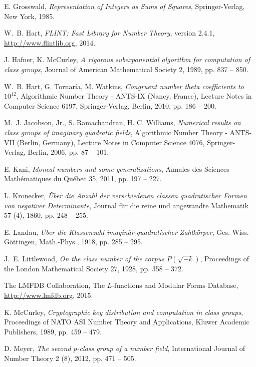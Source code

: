 \documentclass{mcom-l}
\theoremstyle{definition}
\begin{document}
\begin{thebibliography}{10}
E. Grosswald,
\emph{Representation of Integers as Sums of Squares},
Springer-Verlag, New York, 1985.

W.~B. Hart,
\emph{FLINT: Fast Library for Number Theory}, version 2.4.1, \url{http://www.flintlib.org}, 2014.

J. Hafner, K. McCurley,
\emph{A rigorous subexponential algorithm for computation of class groups},
Journal of American Mathematical Society 2, 1989, pp. 837 -- 850.

W.~B. Hart, G. Tornar\'ia, M. Watkins,
\emph{Congruent number theta coefficients to $10^{12}$},
Algorithmic Number Theory - ANTS-IX (Nancy, France), Lecture Notes in Computer Science 6197, Springer-Verlag, Berlin, 2010, pp. 186 -- 200.

M.~J. Jacobson, Jr., S. Ramachandran, H. C. Williams,
\emph{Numerical results on class groups of imaginary quadratic fields},
Algorithmic Number Theory - ANTS-VII (Berlin, Germany), Lecture Notes in Computer Science 4076, Springer-Verlag, Berlin, 2006, pp. 87 -- 101.

E. Kani,
\emph{Idoneal numbers and some generalizations},
Annales des Sciences Math\'ematiques du Qu\'ebec 35, 2011, pp. 197 -- 227.

L. Kronecker,
\emph{\"Uber die Anzahl der verschiedenen classen quadratischer Formen von negativer Determinante},
Journal f\"ur die reine und angewandte Mathematik 57 (4), 1860, pp. 248 -- 255.

E. Landau,
\emph{\"Uber die Klassenzahl imagin\"ar-quadratischer Zahlk\"orper},
Ges. Wiss. G\"ottingen, Math.-Phys., 1918, pp. 285 -- 295.

J.~E. Littlewood,
\emph{On the class number of the corpus $P(\sqrt{-k})$},
Proceedings of the London Mathematical Society 27, 1928, pp. 358 -- 372.

The LMFDB Collaboration,
The $L$-functions and Modular Forms Database,
\url{http://www.lmfdb.org}, 2015.

K. McCurley,
\emph{Cryptographic key distribution and computation in class groups},
Proceedings of NATO ASI Number Theory and Applications, Kluwer Academic Publishers, 1989, pp. 459 -- 479.

D. Meyer,
\emph{The second $p$-class group of a number field},
International Journal of Number Theory 2 (8), 2012, pp. 471 -- 505.


\end{thebibliography}
\end{document}
